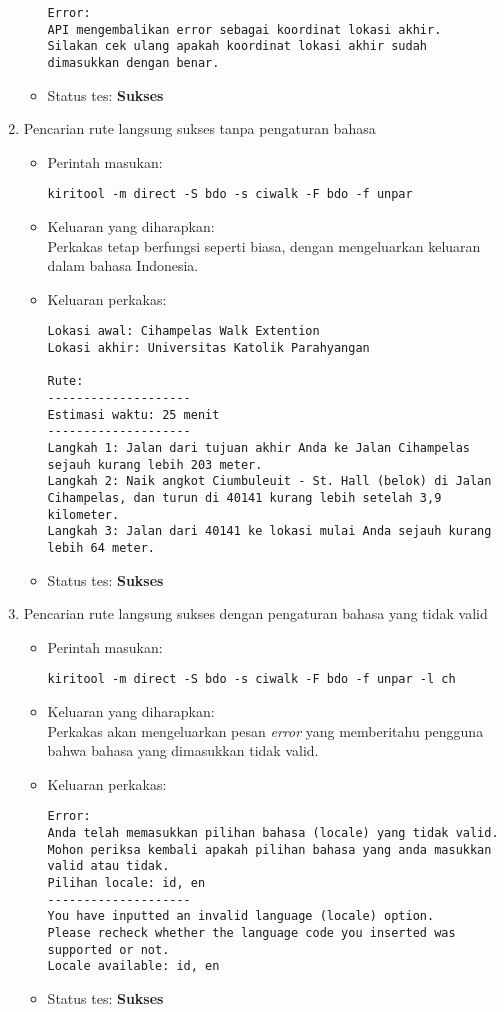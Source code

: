 \begin{enumerate}
\begin{itemize}
\begin{lstlisting}
Error:
API mengembalikan error sebagai koordinat lokasi akhir.
Silakan cek ulang apakah koordinat lokasi akhir sudah dimasukkan dengan benar.
		\end{lstlisting}
		\item Status tes: \textbf{Sukses}
	\end{itemize}
	
	\item Pencarian rute langsung sukses tanpa pengaturan bahasa
	\begin{itemize}
		\item Perintah masukan:
		\begin{verbatim}
kiritool -m direct -S bdo -s ciwalk -F bdo -f unpar
		\end{verbatim}
		\item Keluaran yang diharapkan: \\
		Perkakas tetap berfungsi seperti biasa, dengan mengeluarkan keluaran dalam bahasa Indonesia.
		\item Keluaran perkakas:
		\begin{lstlisting}
Lokasi awal: Cihampelas Walk Extention
Lokasi akhir: Universitas Katolik Parahyangan

Rute:
--------------------
Estimasi waktu: 25 menit
--------------------
Langkah 1: Jalan dari tujuan akhir Anda ke Jalan Cihampelas sejauh kurang lebih 203 meter.
Langkah 2: Naik angkot Ciumbuleuit - St. Hall (belok) di Jalan Cihampelas, dan turun di 40141 kurang lebih setelah 3,9 kilometer.
Langkah 3: Jalan dari 40141 ke lokasi mulai Anda sejauh kurang lebih 64 meter.
		\end{lstlisting}
		\item Status tes: \textbf{Sukses}
	\end{itemize}
	
	\item Pencarian rute langsung sukses dengan pengaturan bahasa yang tidak valid
	\begin{itemize}
		\item Perintah masukan:
		\begin{verbatim}
kiritool -m direct -S bdo -s ciwalk -F bdo -f unpar -l ch
		\end{verbatim}
		\item Keluaran yang diharapkan: \\
		Perkakas akan mengeluarkan pesan \textit{error} yang memberitahu pengguna bahwa bahasa yang dimasukkan tidak valid.
		\item Keluaran perkakas:
		\begin{lstlisting}
Error:
Anda telah memasukkan pilihan bahasa (locale) yang tidak valid.
Mohon periksa kembali apakah pilihan bahasa yang anda masukkan valid atau tidak.
Pilihan locale: id, en
--------------------
You have inputted an invalid language (locale) option.
Please recheck whether the language code you inserted was supported or not.
Locale available: id, en
		\end{lstlisting}
		\item Status tes: \textbf{Sukses}
	\end{itemize}
	
\end{enumerate}

